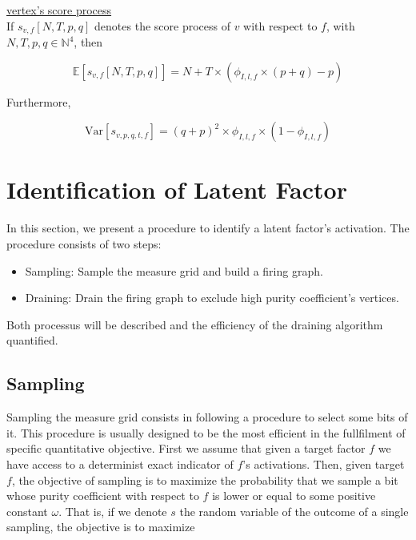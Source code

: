 \documentclass[a4paper, 11pt]{article}
\newcommand{\Var}{\mathrm{Var}}
\begin{document}
\underline{vertex's score process}\\

If $s_{v, f}[N, T, p, q]$ denotes the score process of $v$ with respect to $f$, with $N, T, p, q \in \mathbb{N}^4$, then

\begin{equation}
\label{prop:score_mean}
\mathbb{E} \left[ s_{v, f}[N, T, p, q]  \right] = N + T \times (\phi_{I, l, f} \times (p + q) - p)
\end{equation}

Furthermore,

\begin{equation}
\label{prop:score_var}
\Var \left[ s_{v, p, q, t, f}  \right] = (q + p)^{2} \times \phi_{I, l, f} \times (1 - \phi_{I, l, f})
\end{equation}

\section{Identification of Latent Factor}
In this section, we present a procedure to identify a latent factor's activation. The procedure consists of two steps:

\begin{itemize}
\item Sampling: Sample the measure grid and build a firing graph.
\item Draining: Drain the firing graph to exclude high purity coefficient's vertices.
\end{itemize}

Both processus will be described and the efficiency of the draining algorithm quantified.

\subsection{Sampling}


Sampling the measure grid consists in following a procedure to select some bits of it. This procedure is usually designed to be the most efficient in the fullfilment of specific quantitative objective. First we assume that given a target factor $f$ we have access to a determinist exact indicator of $f$'s activations. Then, given target $f$, the objective of sampling is to maximize the probability that we sample a bit whose purity coefficient with respect to $f$ is lower or equal to some positive constant $\omega$. That is, if we denote $s$ the random variable of the outcome of a single sampling, the objective is to maximize
\end{document}
